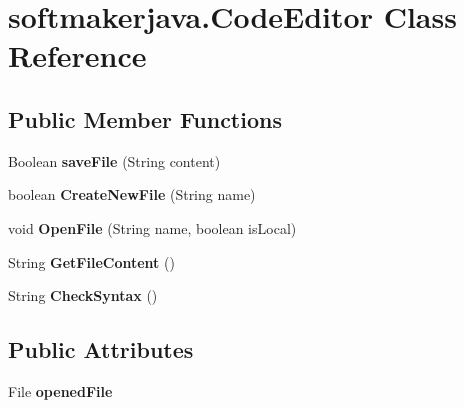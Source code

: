 \hypertarget{classsoftmakerjava_1_1_code_editor}{}\section{softmakerjava.\+Code\+Editor Class Reference}
\label{classsoftmakerjava_1_1_code_editor}
\subsection*{Public Member Functions}
\begin{DoxyCompactItemize}
\item 
Boolean {\bfseries save\+File} (String content)\hypertarget{classsoftmakerjava_1_1_code_editor_a24fa359e65db66d9d1d011a60e8aa96a}{}\label{classsoftmakerjava_1_1_code_editor_a24fa359e65db66d9d1d011a60e8aa96a}

\item 
boolean {\bfseries Create\+New\+File} (String name)\hypertarget{classsoftmakerjava_1_1_code_editor_a3c9bc9f0f801f2a6dd308bbe1520b4c5}{}\label{classsoftmakerjava_1_1_code_editor_a3c9bc9f0f801f2a6dd308bbe1520b4c5}

\item 
void {\bfseries Open\+File} (String name, boolean is\+Local)\hypertarget{classsoftmakerjava_1_1_code_editor_a2ef2c278ce2f01fe008b294a9543021e}{}\label{classsoftmakerjava_1_1_code_editor_a2ef2c278ce2f01fe008b294a9543021e}

\item 
String {\bfseries Get\+File\+Content} ()\hypertarget{classsoftmakerjava_1_1_code_editor_a54aac51672e2b791587ffa164f1f1c3b}{}\label{classsoftmakerjava_1_1_code_editor_a54aac51672e2b791587ffa164f1f1c3b}

\item 
String {\bfseries Check\+Syntax} ()\hypertarget{classsoftmakerjava_1_1_code_editor_a85f6c84ea15f16c907fca6d6825bae70}{}\label{classsoftmakerjava_1_1_code_editor_a85f6c84ea15f16c907fca6d6825bae70}

\end{DoxyCompactItemize}
\subsection*{Public Attributes}
\begin{DoxyCompactItemize}
\item 
File {\bfseries opened\+File}\hypertarget{classsoftmakerjava_1_1_code_editor_a17e3a18d2fd8f389840ff2b7a9711b4d}{}\label{classsoftmakerjava_1_1_code_editor_a17e3a18d2fd8f389840ff2b7a9711b4d}

\end{DoxyCompactItemize}


